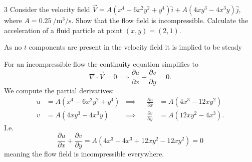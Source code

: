 
\begin{problem}{3}
  Consider the velocity field $\Vec{V} = A \left( x^{4} - 6x^2 y^2 + y^{4} \right) \hat{i} + A \left( 4xy^3 - 4x^3 y \right) \hat{j}$, where $A = \qty{0,25}{\per\m^3\per\s}$.
  Show that the flow field is incompressible. Calculate the acceleration of a fluid particle at point $(x,y) = (2,1)$.
\end{problem}

\begin{assumptions}
  \item As no $t$ components are present in the velocity field it is implied to be steady
\end{assumptions}

\begin{derivation}
   For an incompressible flow the continuity equation simplifies to
   \begin{equation*}
     \nabla \cdot \Vec{V} = 0 \implies \frac{\partial u}{\partial x} + \frac{\partial v}{\partial y} = 0
   .\end{equation*}
   We compute the partial derivatives:
   \begin{align*}
     u &= A \left( x^{4} - 6x^2 y^2 + y^{4} \right) & \implies& & \frac{\partial u}{\partial x} &= A \left( 4x^3 - 12 xy^2 \right) \\
     v &= A \left( 4xy^3 - 4x^3 y \right) & \implies& & \frac{\partial v}{\partial y} &= A \left( 12 xy^2 - 4x^3 \right)
   .\end{align*}
   I.e.
   \begin{equation*}
     \frac{\partial u}{\partial x} + \frac{\partial v}{\partial y} = A \left( 4x^3 - 4x^3 + 12xy^2 - 12xy^2 \right) = 0
   \end{equation*}
   meaning the flow field is incompressible everywhere.
   

\end{derivation}
